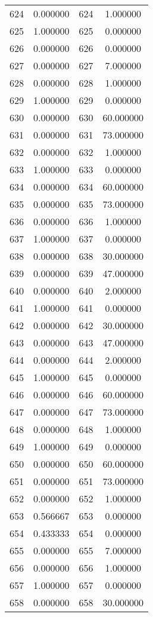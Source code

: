 \documentclass[12pt]{article}
\begin{document}
\begin{longtable}{@{}cccc@{}}
624 & 0.000000 & 624 & 1.000000 \\
625 & 1.000000 & 625 & 0.000000 \\
626 & 0.000000 & 626 & 0.000000 \\
627 & 0.000000 & 627 & 7.000000 \\
628 & 0.000000 & 628 & 1.000000 \\
629 & 1.000000 & 629 & 0.000000 \\
630 & 0.000000 & 630 & 60.000000 \\
631 & 0.000000 & 631 & 73.000000 \\
632 & 0.000000 & 632 & 1.000000 \\
633 & 1.000000 & 633 & 0.000000 \\
634 & 0.000000 & 634 & 60.000000 \\
635 & 0.000000 & 635 & 73.000000 \\
636 & 0.000000 & 636 & 1.000000 \\
637 & 1.000000 & 637 & 0.000000 \\
638 & 0.000000 & 638 & 30.000000 \\
639 & 0.000000 & 639 & 47.000000 \\
640 & 0.000000 & 640 & 2.000000 \\
641 & 1.000000 & 641 & 0.000000 \\
642 & 0.000000 & 642 & 30.000000 \\
643 & 0.000000 & 643 & 47.000000 \\
644 & 0.000000 & 644 & 2.000000 \\
645 & 1.000000 & 645 & 0.000000 \\
646 & 0.000000 & 646 & 60.000000 \\
647 & 0.000000 & 647 & 73.000000 \\
648 & 0.000000 & 648 & 1.000000 \\
649 & 1.000000 & 649 & 0.000000 \\
650 & 0.000000 & 650 & 60.000000 \\
651 & 0.000000 & 651 & 73.000000 \\
652 & 0.000000 & 652 & 1.000000 \\
653 & 0.566667 & 653 & 0.000000 \\
654 & 0.433333 & 654 & 0.000000 \\
655 & 0.000000 & 655 & 7.000000 \\
656 & 0.000000 & 656 & 1.000000 \\
657 & 1.000000 & 657 & 0.000000 \\
658 & 0.000000 & 658 & 30.000000 \\

\end{longtable}
\end{document}
